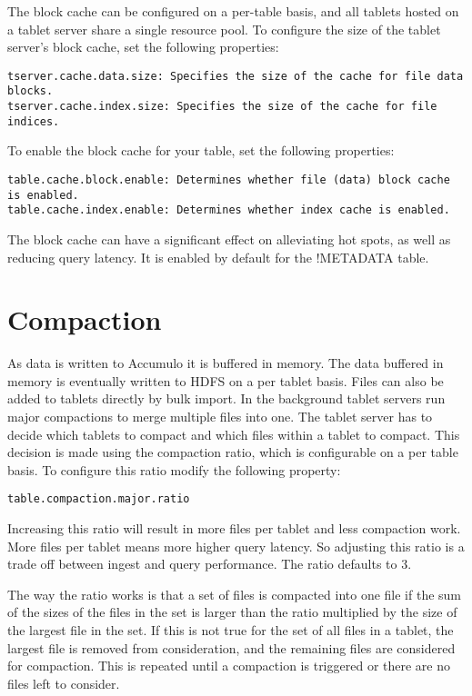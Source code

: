 The block cache can be configured on a per-table basis, and all tablets hosted on a tablet server share a single resource pool.
To configure the size of the tablet server's block cache, set the following properties:
\begin{verbatim}
tserver.cache.data.size: Specifies the size of the cache for file data blocks.
tserver.cache.index.size: Specifies the size of the cache for file indices.
\end{verbatim}
To enable the block cache for your table, set the following properties:
\begin{verbatim}
table.cache.block.enable: Determines whether file (data) block cache is enabled.
table.cache.index.enable: Determines whether index cache is enabled.
\end{verbatim}

The block cache can have a significant effect on alleviating hot spots, as well as reducing query latency.
It is enabled by default for the !METADATA table.

\section{Compaction}

As data is written to Accumulo it is buffered in memory.  The data buffered in
memory is eventually written to HDFS on a per tablet basis.  Files can also be
added to tablets directly by bulk import.  In the background tablet servers run
major compactions to merge multiple files into one.  The tablet server has to
decide which tablets to compact and which files within a tablet to compact.
This decision is made using the compaction ratio, which is configurable on a
per table basis.  To configure this ratio modify the following property:

\begin{verbatim}
table.compaction.major.ratio
\end{verbatim}  

Increasing this ratio will result in more files per tablet and less compaction
work.  More files per tablet means more higher query latency.  So adjusting
this ratio is a trade off between ingest and query performance.  The ratio
defaults to 3.  

The way the ratio works is that a set of files is compacted into one file if the
sum of the sizes of the files in the set is larger than the ratio multiplied by
the size of the largest file in the set. If this is not true for the set of all
files in a tablet, the largest file is removed from consideration, and the
remaining files are considered for compaction. This is repeated until a
compaction is triggered or there are no files left to consider.

